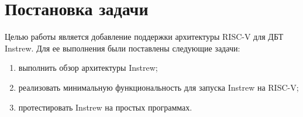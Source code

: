 
\section{Постановка задачи}
\label{sec:task}

Целью работы является добавление поддержки архитектуры \mbox{RISC-V} для ДБТ Instrew. Для ее выполнения были поставлены следующие задачи:
\begin{enumerate}
    \item выполнить обзор архитектуры Instrew;
    \item реализовать минимальную функциональность для запуска Instrew на RISC-V;
    \item протестировать Instrew на простых программах.
\end{enumerate}

